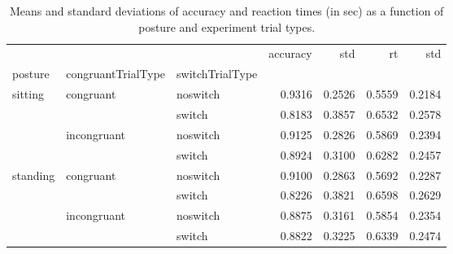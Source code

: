 \begin{table}
\centering
\caption{Means and standard deviations of accuracy and reaction times (in sec) as a function of posture and experiment trial types.}
\label{table-task-switching-replication-reaction-time}
\begin{tabular}{lllrrrr}
\toprule
         &             &        & accuracy &    std &     rt &    std \\
posture & congruantTrialType & switchTrialType &          &        &        &        \\
\midrule
sitting & congruant & noswitch &   0.9316 & 0.2526 & 0.5559 & 0.2184 \\
         &             & switch &   0.8183 & 0.3857 & 0.6532 & 0.2578 \\
         & incongruant & noswitch &   0.9125 & 0.2826 & 0.5869 & 0.2394 \\
         &             & switch &   0.8924 & 0.3100 & 0.6282 & 0.2457 \\
standing & congruant & noswitch &   0.9100 & 0.2863 & 0.5692 & 0.2287 \\
         &             & switch &   0.8226 & 0.3821 & 0.6598 & 0.2629 \\
         & incongruant & noswitch &   0.8875 & 0.3161 & 0.5854 & 0.2354 \\
         &             & switch &   0.8822 & 0.3225 & 0.6339 & 0.2474 \\
\bottomrule
\end{tabular}
\end{table}
